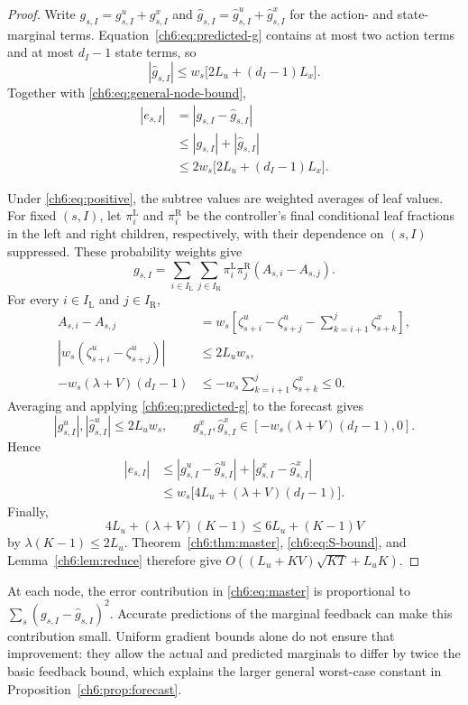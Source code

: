 \documentclass[11pt]{article}
\theoremstyle{plain}
\theoremstyle{remark}
\numberwithin{equation}{section}
\begin{document}
\begin{proof}
Write $g_{s,I}=g_{s,I}^u+g_{s,I}^x$ and
$\widehat g_{s,I}=\widehat g_{s,I}^u+\widehat g_{s,I}^x$ for the
action- and state-marginal terms.  Equation~\eqref{ch6:eq:predicted-g}
contains at most two action terms and at most $d_I-1$ state terms, so
\[
|\widehat g_{s,I}|
\le w_s\bigl[2L_u+(d_I-1)L_x\bigr].
\]
Together with \eqref{ch6:eq:general-node-bound},
\begin{align*}
|e_{s,I}|
&=|g_{s,I}-\widehat g_{s,I}|\\
&\le|g_{s,I}|+|\widehat g_{s,I}|\\
&\le2w_s\bigl[2L_u+(d_I-1)L_x\bigr].
\end{align*}

Under \eqref{ch6:eq:positive}, the subtree values are weighted
averages of leaf values. For fixed $(s,I)$, let $\pi_i^{\mathrm{L}}$ and
$\pi_i^{\mathrm{R}}$ be the controller's final conditional leaf fractions
in the left and right children, respectively, with their dependence on
$(s,I)$ suppressed. These probability weights give
\[
g_{s,I}
=\sum_{i\in I_{\mathrm{L}}}\sum_{j\in I_{\mathrm{R}}}\pi_i^{\mathrm{L}}\pi_j^{\mathrm{R}}(A_{s,i}-A_{s,j}).
\]
For every $i\in I_{\mathrm{L}}$ and $j\in I_{\mathrm{R}}$,
\begin{align*}
A_{s,i}-A_{s,j}
&=w_s\left[
\zeta_{s+i}^u-\zeta_{s+j}^u
-\sum_{k=i+1}^{j}\zeta_{s+k}^x\right],\\
\left|w_s(\zeta_{s+i}^u-\zeta_{s+j}^u)\right|
&\le2L_uw_s,\\
-w_s(\lambda+V)(d_I-1)
&\le-w_s\sum_{k=i+1}^{j}\zeta_{s+k}^x\le0.
\end{align*}
Averaging and applying \eqref{ch6:eq:predicted-g} to the forecast gives
\[
|g_{s,I}^u|,|\widehat g_{s,I}^u|\le2L_uw_s,
\qquad
g_{s,I}^x,\widehat g_{s,I}^x
\in[-w_s(\lambda+V)(d_I-1),0].
\]
Hence
\begin{align*}
|e_{s,I}|
&\le|g_{s,I}^u-\widehat g_{s,I}^u|
  +|g_{s,I}^x-\widehat g_{s,I}^x|\\
&\le w_s\bigl[4L_u+(\lambda+V)(d_I-1)\bigr].
\end{align*}
Finally,
\[
4L_u+(\lambda+V)(K-1)
\le6L_u+(K-1)V
\]
by $\lambda(K-1)\le2L_u$.  Theorem~\ref{ch6:thm:master},
\eqref{ch6:eq:S-bound}, and Lemma~\ref{ch6:lem:reduce} therefore give
$O((L_u+KV)\sqrt{KT}+L_uK)$.
\end{proof}

At each node, the error contribution in \eqref{ch6:eq:master} is proportional
to $\sum_s(g_{s,I}-\widehat g_{s,I})^2$. Accurate predictions of the marginal
feedback can make this contribution small. Uniform gradient bounds alone
do not ensure that improvement: they allow the actual and predicted
marginals to differ by twice the basic feedback bound, which explains the
larger general worst-case constant in Proposition~\ref{ch6:prop:forecast}.
\end{document}
